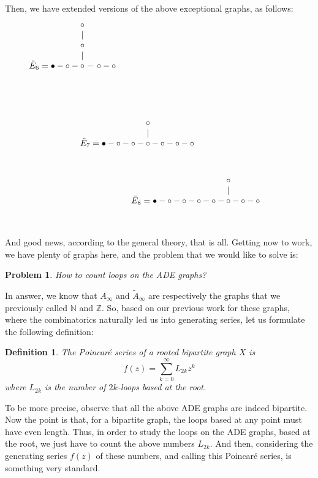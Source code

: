 \documentclass[12pt]{amsbook}
\newtheorem{definition}[theorem]{Definition}
\newtheorem{problem}[theorem]{Problem}
\begin{document}
Then, we have extended versions of the above exceptional graphs, as follows:
$$\tilde{E}_6=\bullet-\circ-\begin{matrix}
\circ\\
|
\\
\circ\\
|&\\
\circ&\!\!\!\!-\ \circ\\
\ \\
\   \\
\ \\
\ \end{matrix}-\circ\hskip71mm$$
\vskip-22mm
$$\tilde{E}_7=\bullet-\circ-\circ-
\begin{matrix}\circ\\
|\\
\circ\\
\ \\
\ \end{matrix}-
\circ-\circ-\circ\hskip18mm$$
\vskip-15mm
$$\hskip30mm \tilde{E}_8=\bullet-\circ-\circ-\circ-\circ-
\begin{matrix}\circ\\
|\\
\circ\\
\ \\
\ \end{matrix}-
\circ-\circ$$
\vskip-5mm

And good news, according to the general theory, that is all. Getting now to work, we have plenty of graphs here, and the problem that we would like to solve is:

\begin{problem}
How to count loops on the ADE graphs?
\end{problem}

In answer, we know that $A_\infty$ and $\tilde{A}_\infty$ are respectively the graphs that we previously called $\mathbb N$ and $\mathbb Z$. So, based on our previous work for these graphs, where the combinatorics naturally led us into generating series, let us formulate the following definition:

\begin{definition}
The Poincar\'e series of a rooted bipartite graph $X$ is
$$f(z)=\sum_{k=0}^\infty L_{2k}z^k$$
where $L_{2k}$ is the number of $2k$-loops based at the root.
\end{definition}

To be more precise, observe that all the above ADE graphs are indeed bipartite. Now the point is that, for a bipartite graph, the loops based at any point must have even length. Thus, in order to study the loops on the ADE graphs, based at the root, we just have to count the above numbers $L_{2k}$. And then, considering the generating series $f(z)$ of these numbers, and calling this Poincar\'e series, is something very standard.
\end{document}
